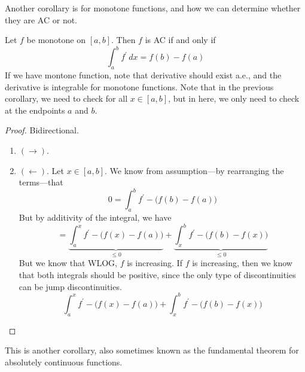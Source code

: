   Another corollary is for monotone functions, and how we can determine whether they are AC or not. 

  \begin{corollary}
    Let $f$ be monotone on $[a, b]$. Then $f$ is AC if and only if 
    \begin{equation}
      \int_a^b f^\prime \,dx = f(b) - f(a)
    \end{equation}
    If we have montone function, note that derivative should exist a.e., and the derivative is integrable for monotone functions. Note that in the previous corollary, we need to check for all $x \in [a, b]$, but in here, we only need to check at the endpoints $a$ and $b$. 
  \end{corollary}
  \begin{proof}
    Bidirectional. 
    \begin{enumerate}
      \item $(\rightarrow)$. 
      \item $(\leftarrow)$. Let $x \in [a, b]$. We know from assumption---by rearranging the terms---that
      \begin{equation}
        0 = \int_a^b f^\prime - \big( f(b) - f(a) \big)
      \end{equation}
      But by additivity of the integral, we have 
      \begin{equation}
        = \underbrace{\int_a^x f^\prime - \big( f(x) - f(a) \big)}_{\leq 0} + \underbrace{\int_x^b f^\prime - \big( f(b) - f(x) \big)}_{\leq 0}
      \end{equation}
      But we know that WLOG, $f$ is increasing. If $f$ is increasing, then we know that both integrals should be positive, since the only type of discontinuities can be jump discontinuities. 
      \begin{equation}
        \int_a^x f^\prime - \big( f(x) - f(a) \big) + \int_x^b f^\prime - \big( f(b) - f(x) \big)
      \end{equation}

    \end{enumerate}
  \end{proof}

  This is another corollary, also sometimes known as the fundamental theorem for absolutely continuous functions. 

